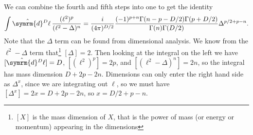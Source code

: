 \documentclass[fleqn]{NotesClass}
\newcommand{\dhat}[1]{\hat{\symrm{d}}{#1}}
\begin{document}
    We can combine the fourth and fifth steps into one to get the identity
    \begin{equation*}
        \int \dhat{^D\ell} \, \frac{(\ell^2)^p}{(\ell^2 - \Delta)^n} = \frac{i}{(4\pi)^{D/2}} \frac{(-1)^{p + n} \Gamma(n - p - D/2)\Gamma(p + D/2)}{\Gamma(n)\Gamma(D/2)} \Delta^{p/2 + p - n}.
    \end{equation*}
    Note that the \(\Delta\) term can be found from dimensional analysis.
    We know from the \(\ell^2 - \Delta\) term that\footnote{\([X]\) is the mass dimension of \(X\), that is the power of mass (or energy or momentum) appearing in the dimensions} \([\Delta] = 2\).
    Then looking at the integral on the left we have \([\dhat{^D\ell}] = D\), \([(\ell^2)^p] = 2p\), and \([(\ell^2 - \Delta)^n] = 2n\), so the integral has mass dimension \(D + 2p - 2n\).
    Dimensions can only enter the right hand side as \(\Delta^x\), since we are integrating out \(\ell\), so we must have \([\Delta^x] = 2x = D + 2p - 2n\), so \(x = D/2 + p - n\).
    
%        
    
    \backmatter
    \printindex
\end{document}
